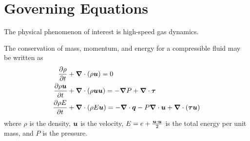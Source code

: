 \documentclass[compress,11pt]{beamer}
\begin{document}
\section{Governing Equations}
\frame
{
  The physical phenomenon of interest is high-speed gas dynamics.
  \vspace{1.5em}
  
  The conservation of mass, momentum, and energy for a compressible fluid may be written as
  \begin{align}
    \label{eq:pde_comp_mass}
    {\frac{\partial{\rho}}{\partial{t}}} &+ {\boldsymbol{\nabla}} {}\cdot \left(\rho{\boldsymbol{u}}\right) = 0 \\
    \label{eq:pde_comp_mom}
    {\frac{\partial{\rho{\boldsymbol{u}}}}{\partial{t}}} &+ {\boldsymbol{\nabla}} {}\cdot\left(\rho{\boldsymbol{u}}{\boldsymbol{u}}\right) =
    -{\boldsymbol{\nabla}} {P} + {\boldsymbol{\nabla}} {}\cdot{\boldsymbol{\tau}} \\
    \label{eq:pde_comp_energy}
    {\frac{\partial{\rho E}}{\partial{t}}} &+ {\boldsymbol{\nabla}} {}\cdot\left(\rho E {\boldsymbol{u}}\right) =
    -{\boldsymbol{\nabla}} {}\cdot{\boldsymbol{q}} - P{\boldsymbol{\nabla}} {}\cdot{\boldsymbol{u}} + {\boldsymbol{\nabla}} {}\cdot\left({\boldsymbol{\tau}}{\boldsymbol{u}}\right)  
  \end{align}
  where $\rho$ is the density, ${\boldsymbol{u}}$ is the velocity, $E=e + \frac{{\boldsymbol{u}}\cdot{\boldsymbol{u}}}{2}$ is the total energy per unit mass, and $P$ is the pressure.
}

\end{document}

